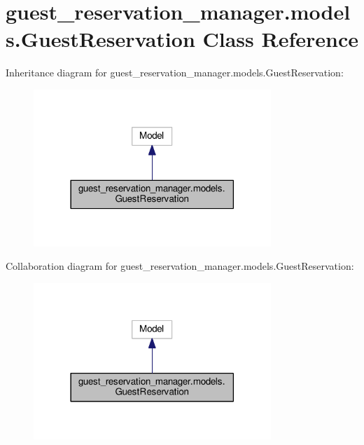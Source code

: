 \hypertarget{classguest__reservation__manager_1_1models_1_1GuestReservation}{\section{guest\-\_\-reservation\-\_\-manager.\-models.\-Guest\-Reservation Class Reference}
\label{classguest__reservation__manager_1_1models_1_1GuestReservation}
}


Inheritance diagram for guest\-\_\-reservation\-\_\-manager.\-models.\-Guest\-Reservation\-:
\nopagebreak
\begin{figure}[H]
\begin{center}
\leavevmode
\includegraphics[width=254pt]{classguest__reservation__manager_1_1models_1_1GuestReservation__inherit__graph}
\end{center}
\end{figure}


Collaboration diagram for guest\-\_\-reservation\-\_\-manager.\-models.\-Guest\-Reservation\-:
\nopagebreak
\begin{figure}[H]
\begin{center}
\leavevmode
\includegraphics[width=254pt]{classguest__reservation__manager_1_1models_1_1GuestReservation__coll__graph}
\end{center}
\end{figure}


